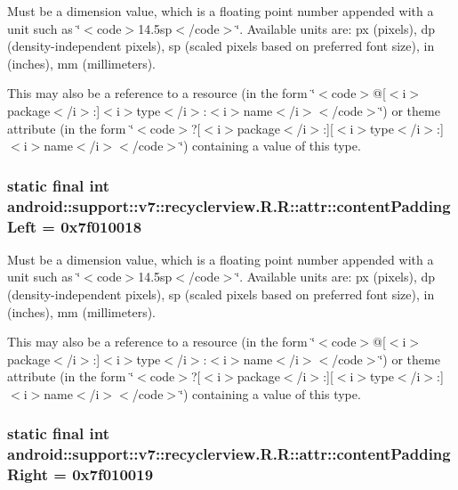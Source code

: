 Must be a dimension value, which is a floating point number appended with a unit such as \char`\"{}$<$code$>$14.5sp$<$/code$>$\char`\"{}. Available units are: px (pixels), dp (density-independent pixels), sp (scaled pixels based on preferred font size), in (inches), mm (millimeters). 

This may also be a reference to a resource (in the form \char`\"{}$<$code$>$@\mbox{[}$<$i$>$package$<$/i$>$:\mbox{]}$<$i$>$type$<$/i$>$:$<$i$>$name$<$/i$>$$<$/code$>$\char`\"{}) or theme attribute (in the form \char`\"{}$<$code$>$?\mbox{[}$<$i$>$package$<$/i$>$:\mbox{]}\mbox{[}$<$i$>$type$<$/i$>$:\mbox{]}$<$i$>$name$<$/i$>$$<$/code$>$\char`\"{}) containing a value of this type. \hypertarget{classandroid_1_1support_1_1v7_1_1recyclerview_1_1_r_1_1attr_88a1cf4a23a8804c17e839d2ec021b2a}{
\subsubsection[{contentPaddingLeft}]{\setlength{\rightskip}{0pt plus 5cm}static final int android::support::v7::recyclerview.R.R::attr::contentPaddingLeft = 0x7f010018}}
\label{classandroid_1_1support_1_1v7_1_1recyclerview_1_1_r_1_1attr_88a1cf4a23a8804c17e839d2ec021b2a}


Must be a dimension value, which is a floating point number appended with a unit such as \char`\"{}$<$code$>$14.5sp$<$/code$>$\char`\"{}. Available units are: px (pixels), dp (density-independent pixels), sp (scaled pixels based on preferred font size), in (inches), mm (millimeters). 

This may also be a reference to a resource (in the form \char`\"{}$<$code$>$@\mbox{[}$<$i$>$package$<$/i$>$:\mbox{]}$<$i$>$type$<$/i$>$:$<$i$>$name$<$/i$>$$<$/code$>$\char`\"{}) or theme attribute (in the form \char`\"{}$<$code$>$?\mbox{[}$<$i$>$package$<$/i$>$:\mbox{]}\mbox{[}$<$i$>$type$<$/i$>$:\mbox{]}$<$i$>$name$<$/i$>$$<$/code$>$\char`\"{}) containing a value of this type. \hypertarget{classandroid_1_1support_1_1v7_1_1recyclerview_1_1_r_1_1attr_d981efd45b876679ce83138c03b6e30c}{
\subsubsection[{contentPaddingRight}]{\setlength{\rightskip}{0pt plus 5cm}static final int android::support::v7::recyclerview.R.R::attr::contentPaddingRight = 0x7f010019}}
\label{classandroid_1_1support_1_1v7_1_1recyclerview_1_1_r_1_1attr_d981efd45b876679ce83138c03b6e30c}


